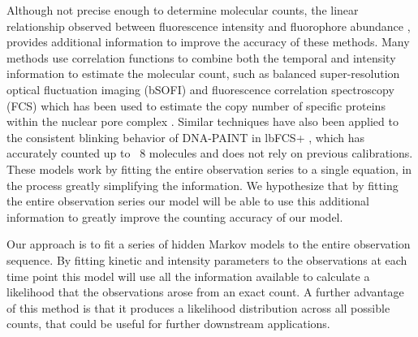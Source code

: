 Although not precise enough to determine molecular counts, the linear
relationship observed between fluorescence intensity and fluorophore abundance
\cite{schmied_fluorescence_2012}, provides additional information to improve the
accuracy of these methods.
%
  Many methods use correlation functions to combine both the temporal and
  intensity information to estimate the molecular count, such as balanced
  super-resolution optical fluctuation imaging (bSOFI) and fluorescence
  correlation spectroscopy (FCS) which has been used to estimate the copy
  number of specific proteins within the nuclear pore complex
  \cite{otsuka_quantitative_2023}. Similar techniques have also been applied to the
  consistent blinking behavior of DNA-PAINT in lbFCS+ \cite{stein_calibration-free_2021}, which has
  accurately counted up to ~8 molecules and does not rely on previous
  calibrations. These models work by fitting the entire observation series to a
  single equation, in the process greatly simplifying the information. We
  hypothesize that by fitting the entire observation series our model will be
  able to use this additional information to greatly improve the counting
  accuracy of our model.

Our approach is to fit a series of hidden Markov models to the entire
observation sequence.
%
  By fitting kinetic and intensity parameters to the observations at each time
  point this model will use all the information available to calculate a
  likelihood that the observations arose from an exact count. A further
  advantage of this method is that it produces a likelihood distribution across
  all possible counts, that could be useful for further downstream
  applications.
